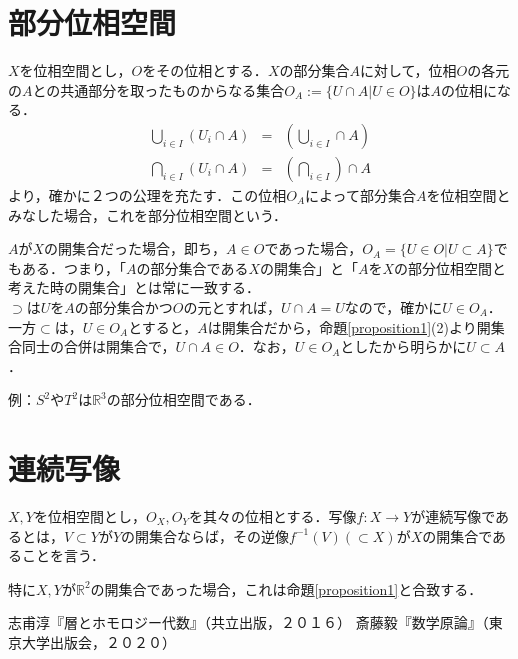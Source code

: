 \documentclass[uplatex, dvipdfmx]{jsreport}
\begin{document}
\section{部分位相空間}
$X$を位相空間とし，$O$をその位相とする．$X$の部分集合$A$に対して，位相$O$の各元の$A$との共通部分を取ったものからなる集合$O_A:=\{ U\cap A | U\in O \}$は$A$の位相になる．
\begin{eqnarray*}
    \bigcup_{i\in I}(U_i\cap A) &=& (\bigcup_{i\in I} \cap A) \\
    \bigcap_{i\in I}(U_i\cap A) &=& (\bigcap_{i\in I}) \cap A 
\end{eqnarray*}
より，確かに２つの公理を充たす．この位相$O_A$によって部分集合$A$を位相空間とみなした場合，これを部分位相空間という．\par

$A$が$X$の開集合だった場合，即ち，$A\in O$であった場合，$O_A=\{U\in O | U\subset A \}$でもある．つまり，「$A$の部分集合である$X$の開集合」と「$A$を$X$の部分位相空間と考えた時の開集合」とは常に一致する．\\
$\supset$は$U$を$A$の部分集合かつ$O$の元とすれば，$U\cap A=U$なので，確かに$U\in O_A$．一方$\subset$は，$U\in O_A$とすると，$A$は開集合だから，命題\ref{proposition1}(2)より開集合同士の合併は開集合で，$U\cap A \in O$．なお，$U\in O_A$としたから明らかに$U\subset A$．

例：$S^2やT^2$は$\mathbb{R}^3$の部分位相空間である．\\

\section{連続写像}

\begin{shadebox}\begin{definition}[連続写像]
    $X,Y$を位相空間とし，$O_X,O_Y$を其々の位相とする．写像$f:X\rightarrow Y$が連続写像であるとは，$V\subset Y$が$Y$の開集合ならば，その逆像$f^{-1}(V)(\subset X)$が$X$の開集合であることを言う．
\end{definition}\end{shadebox}
特に$X,Y$が$\mathbb{R}^2$の開集合であった場合，これは命題\ref{proposition1}と合致する．

\begin{thebibliography}{9}
        志甫淳『層とホモロジー代数』（共立出版，２０１６）
        斎藤毅『数学原論』（東京大学出版会，２０２０）
\end{thebibliography}
\end{document}
